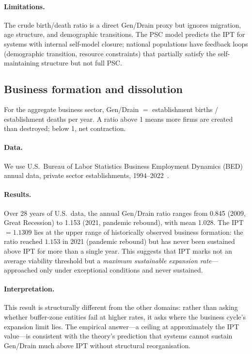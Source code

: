\documentclass[11pt,twocolumn]{article}
\theoremstyle{remark}
\begin{document}
\paragraph{Limitations.}
The crude birth/death ratio is a direct Gen/Drain proxy but ignores migration, age structure,
and demographic transitions. The PSC model predicts the IPT for systems with internal
self-model closure; national populations have feedback loops (demographic transition,
resource constraints) that partially satisfy the self-maintaining structure but not full PSC.

\subsection{Business formation and dissolution}
\label{sec:realworld:biz}

For the aggregate business sector, Gen/Drain $=$ establishment births / establishment deaths
per year. A ratio above 1 means more firms are created than destroyed; below 1, net contraction.

\paragraph{Data.}
We use U.S.\ Bureau of Labor Statistics Business Employment Dynamics (BED) annual data,
private sector establishments, 1994--2022~\cite{BLS_BED}.

\paragraph{Results.}
Over 28 years of U.S.\ data, the annual Gen/Drain ratio ranges from 0.845 (2009, Great
Recession) to 1.153 (2021, pandemic rebound), with mean 1.028. The IPT $= 1.1309$ lies at the upper range of historically observed business formation:
the ratio reached $1.153$ in 2021 (pandemic rebound) but has never been sustained above
IPT for more than a single year. This suggests that IPT marks not an average viability
threshold but a \emph{maximum sustainable expansion rate}---approached only under
exceptional conditions and never sustained.

\paragraph{Interpretation.}
This result is structurally different from the other domains: rather than asking whether
buffer-zone entities fail at higher rates, it asks where the business cycle's expansion
limit lies. The empirical answer---a ceiling at approximately the IPT value---is consistent
with the theory's prediction that systems cannot sustain Gen/Drain much above IPT without
structural reorganisation.
\end{document}
